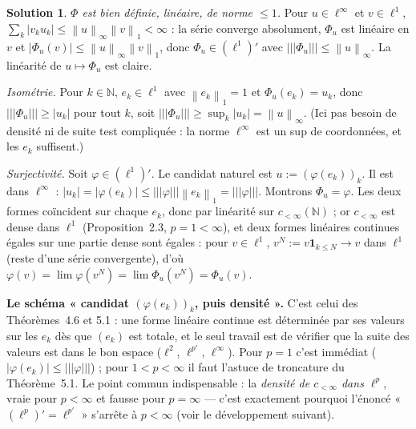 \documentclass[11pt,a4paper]{article}
\newcommand{\N}{\mathbb{N}}
\newcommand{\norm}[1]{\left\|#1\right\|}
\newcommand{\opnorm}[1]{|\!|\!|#1|\!|\!|}
\theoremstyle{definition}
\newtheorem*{solution}{Solution}
\begin{document}
\begin{solution}
\emph{$\Phi$ est bien définie, linéaire, de norme $\le1$.} Pour $u\in\ell^\infty$ et $v\in\ell^1$, $\sum_k|v_ku_k|\le\norm u_\infty\norm v_1<\infty$ : la série converge absolument, $\Phi_u$ est linéaire en $v$ et $|\Phi_u(v)|\le\norm u_\infty\norm v_1$, donc $\Phi_u\in(\ell^1)'$ avec $\opnorm{\Phi_u}\le\norm u_\infty$. La linéarité de $u\mapsto\Phi_u$ est claire.

\emph{Isométrie.} Pour $k\in\N$, $e_k\in\ell^1$ avec $\norm{e_k}_1=1$ et $\Phi_u(e_k)=u_k$, donc $\opnorm{\Phi_u}\ge|u_k|$ pour tout $k$, soit $\opnorm{\Phi_u}\ge\sup_k|u_k|=\norm u_\infty$. (Ici pas besoin de densité ni de suite test compliquée : la norme $\ell^\infty$ est un sup de coordonnées, et les $e_k$ suffisent.)

\emph{Surjectivité.} Soit $\varphi\in(\ell^1)'$. Le candidat naturel est $u:=(\varphi(e_k))_k$. Il est dans $\ell^\infty$ : $|u_k|=|\varphi(e_k)|\le\opnorm\varphi\norm{e_k}_1=\opnorm\varphi$. Montrons $\Phi_u=\varphi$. Les deux formes coïncident sur chaque $e_k$, donc par linéarité sur $c_{<\infty}(\N)$ ; or $c_{<\infty}$ est dense dans $\ell^1$ (Proposition~2.3, $p=1<\infty$), et deux formes linéaires continues égales sur une partie dense sont égales : pour $v\in\ell^1$, $v^N:=v\mathbf 1_{k\le N}\to v$ dans $\ell^1$ (reste d'une série convergente), d'où $\varphi(v)=\lim\varphi(v^N)=\lim\Phi_u(v^N)=\Phi_u(v)$.
\end{solution}

\begin{pointcle}
\textbf{Le schéma « candidat $(\varphi(e_k))_k$, puis densité ».} C'est celui des Théorèmes~4.6 et 5.1 : une forme linéaire continue est déterminée par ses valeurs sur les $e_k$ dès que $(e_k)$ est totale, et le seul travail est de vérifier que la suite des valeurs est dans le bon espace ($\ell^2$, $\ell^{p'}$, $\ell^\infty$). Pour $p=1$ c'est immédiat ($|\varphi(e_k)|\le\opnorm\varphi$) ; pour $1<p<\infty$ il faut l'astuce de troncature du Théorème~5.1. Le point commun indispensable : la \emph{densité de $c_{<\infty}$ dans $\ell^p$}, vraie pour $p<\infty$ et fausse pour $p=\infty$ — c'est exactement pourquoi l'énoncé « $(\ell^p)'=\ell^{p'}$ » s'arrête à $p<\infty$ (voir le développement suivant).
\end{pointcle}
\end{document}
